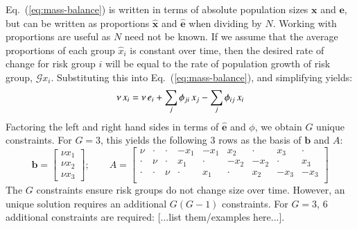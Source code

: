 Eq.~(\ref{eq:mass-balance}) is written in terms of
absolute population sizes $\bm{x}$ and $\bm{e}$, 
but can be written 
as proportions $\bm{\hat{x}}$ and $\bm{\hat{e}}$ 
when dividing by $N$. Working with proportions are
useful as $N$ need not be known.			
If we assume that the average proportions of each group $\hat{x}_i$ is constant over time,  %
then the desired rate of change for risk group $i$
will be equal to the rate of population growth of risk group, $\mathcal{G} x_i$.
Substituting this into Eq.~(\ref{eq:mass-balance}),  %
and simplifying yields:
\begin{equation}\label{eq:system}
\nu \thinspace x_i
= \nu \thinspace e_i + \sum_{j}{\phi_{ji} \thinspace x_j}
- \sum_{j}{\phi_{ij} \thinspace x_i}
\end{equation}
Factoring the left and right hand sides in terms of $\bm{\hat{e}}$ and $\phi$,
we obtain $G$ unique constraints.
For $G = 3$, this yields the following 3 rows as the basis of $\bm{b}$ and $A$:
\begin{equation}\label{eq:b-A-basis}
\bm{b} = \left[\begin{array}{c}
\nu x_1 \\ \nu x_2 \\ \nu x_3
\end{array}\right];\qquad
A = \left[\begin{array}{ccccccccc}
 \nu  & \cdot & \cdot & -x_1  & -x_1  &  x_2  & \cdot &  x_3  & \cdot \\
\cdot &  \nu  & \cdot &  x_1  & \cdot & -x_2  & -x_2  & \cdot &  x_3  \\
\cdot & \cdot &  \nu  & \cdot &  x_1  & \cdot &  x_2  & -x_3  & -x_3  \\
\end{array}\right] 
\end{equation}
The $G$ constraints ensure risk groups do not change size over time.
However, an unique solution requires
an additional $G(G-1)$ constraints.
For $G = 3$, 6 additional constraints are required: [...list them/examples here...].  %
